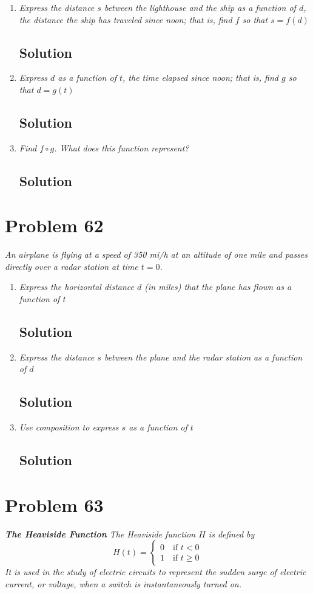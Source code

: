 \documentclass[11pt]{article}
\newcommand{\soln}{\subsection*}
\newcommand{\qn}{\textit}
\begin{document}
\begin{enumerate}
	\item \qn{Express the distance $s$ between the lighthouse and the ship as a function of $d$, the distance the ship has traveled since noon; that is, find $f$ so that $s=f(d)$}
	\soln{Solution}
	
	\item \qn{Express $d$ as a function of $t$, the time elapsed since noon; that is, find $g$ so that $d=g(t)$}
	\soln{Solution}
	
	\item \qn{Find $f \circ g$. What does this function represent?}
	\soln{Solution}
\end{enumerate}

\section*{Problem 62}

\qn{An airplane is flying at a speed of 350 mi/h at an altitude of one mile and passes directly over a radar station at time $t=0$.}

\begin{enumerate}
	\item \qn{Express the horizontal distance $d$ (in miles) that the plane has flown as a function of $t$}
	\soln{Solution}
	
	\item \qn{Express the distance $s$ between the plane and the radar station as a function of $d$}
	\soln{Solution}
	
	\item \qn{Use composition to express $s$ as a function of $t$}
	\soln{Solution}
\end{enumerate}

\section*{Problem 63}

\qn{\textbf{The Heaviside Function} The Heaviside function $H$ is defined by $$H(t)=\begin{cases} 0 \quad\text{if }t<0 \\ 1 \quad\text{if }t \ge 0\end{cases}$$ It is used in the study of electric circuits to represent the sudden surge of electric current, or voltage, when a switch is
instantaneously turned on.}
\end{document}
